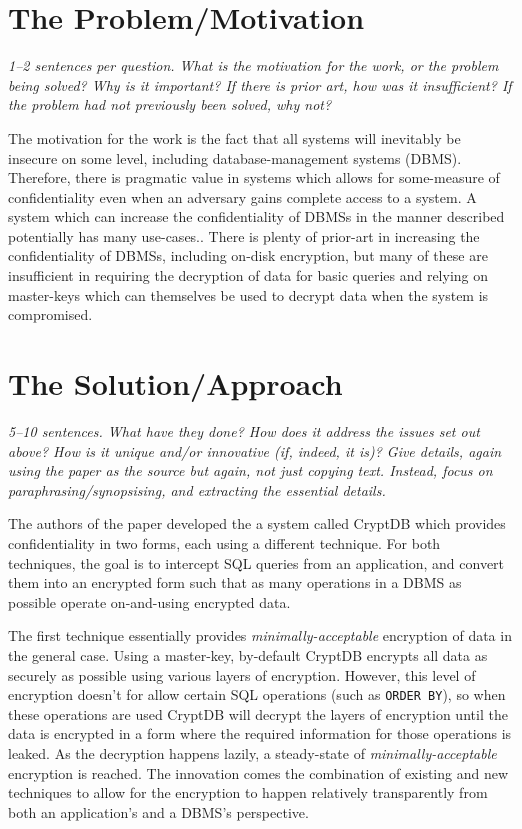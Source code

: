 \documentclass[11pt]{article}
\begin{document}
\section*{The Problem/Motivation}

\textsl{1--2 sentences per question. What is the motivation for the work, or
the problem being solved? Why is it important? If there is prior art, how was
it insufficient? If the problem had not previously been solved, why not?}

The motivation for the work is the fact that all systems will inevitably be
insecure on some level, including database-management systems (DBMS).
Therefore, there is pragmatic value in systems which allows for some-measure of
confidentiality even when an adversary gains complete access to a system. A
system which can increase the confidentiality of DBMSs in the manner described
potentially has many use-cases.. There is plenty of prior-art in increasing the
confidentiality of DBMSs, including on-disk encryption, but many of these are
insufficient in requiring the decryption of data for basic queries and relying
on master-keys which can themselves be used to decrypt data when the system is
compromised.

\section*{The Solution/Approach}

\textsl{5--10 sentences. What have they done? How does it address the issues
set out above? How is it unique and/or innovative (if, indeed, it is)? Give
details, again using the paper as the source but again, not just copying text.
Instead, focus on paraphrasing/synopsising, and extracting the essential
details.}

The authors of the paper developed the a system called CryptDB which provides
confidentiality in two forms, each using a different technique. For both
techniques, the goal is to intercept SQL queries from an application, and
convert them into an encrypted form such that as many operations in a DBMS as
possible operate on-and-using encrypted data.

The first technique essentially provides \textit{minimally-acceptable}
encryption of data in the general case. Using a master-key, by-default CryptDB
encrypts all data as securely as possible using various layers of encryption.
However, this level of encryption doesn't for allow certain SQL operations
(such as \texttt{ORDER BY}), so when these operations are used CryptDB will
decrypt the layers of encryption until the data is encrypted in a form where
the required information for those operations is leaked. As the decryption
happens lazily, a steady-state of \textit{minimally-acceptable} encryption is
reached. The innovation comes the combination of existing and new techniques to
allow for the encryption to happen relatively transparently from both an
application's and a DBMS's perspective.
\end{document}
